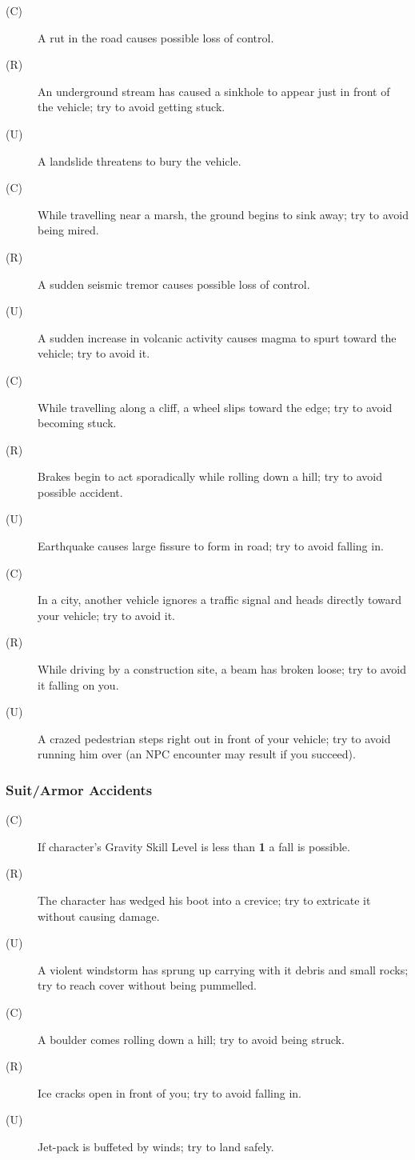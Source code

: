 \begin{description}
\item[(C)] A rut in the road causes possible loss of control.
\item[(R)] An underground stream has caused a sinkhole to appear just
  in front of the vehicle; try to avoid getting stuck.
\item[(U)] A landslide threatens to bury the vehicle.
\item[(C)] While travelling near a marsh, the ground begins to sink
  away; try to avoid being mired.
\item[(R)] A sudden seismic tremor causes possible loss of control.
\item[(U)] A sudden increase in volcanic activity causes magma to
  spurt toward the vehicle; try to avoid it.
\item[(C)] While travelling along a cliff, a wheel slips toward the
  edge; try to avoid becoming stuck.
\item[(R)] Brakes begin to act sporadically while rolling down a hill;
  try to avoid possible accident.
\item[(U)] Earthquake causes large fissure to form in road; try to
  avoid falling in.
\item[(C)] In a city, another vehicle ignores a traffic signal and
  heads directly toward your vehicle; try to avoid it.
\item[(R)] While driving by a construction site, a beam has broken
  loose; try to avoid it falling on you.
\item[(U)] A crazed pedestrian steps right out in front of your
  vehicle; try to avoid running him over (an NPC encounter may result
  if you succeed).
\end{description}

\subsubsection*{Suit/Armor Accidents}
\label{sec:suitarmor-accidents}


\begin{description}
\item[(C)] If character's Gravity Skill Level is less than \textbf{1}
  a fall is possible.
\item[(R)] The character has wedged his boot into a crevice; try to
  extricate it without causing damage.
\item[(U)] A violent windstorm has sprung up carrying with it debris
  and small rocks; try to reach cover without being pummelled.
\item[(C)] A boulder comes rolling down a hill; try to avoid being
  struck.
\item[(R)] Ice cracks open in front of you; try to avoid falling in.
\item[(U)] Jet-pack is buffeted by winds; try to land safely.
\end{description}

